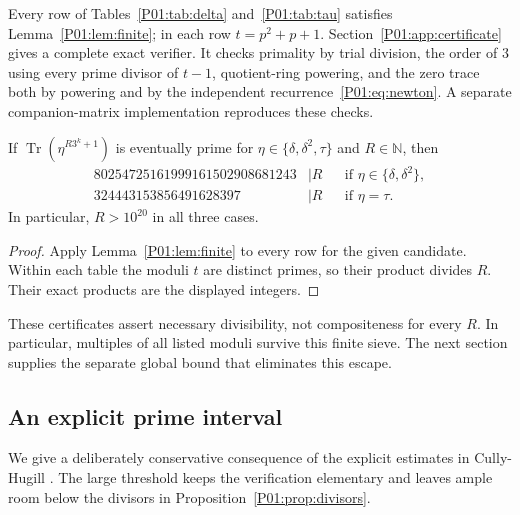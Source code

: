 \documentclass[11pt,a4paper]{article}
\theoremstyle{definition}\newtheorem{definition}[theorem]{Definition}
\theoremstyle{remark}\newtheorem{remark}[theorem]{Remark}
\newcommand{\N}{\mathbb N}\newcommand{\Z}{\mathbb Z}\newcommand{\Q}{\mathbb Q}
\DeclareMathOperator{\Tr}{Tr}\DeclareMathOperator{\tr}{tr}\DeclareMathOperator{\Nm}{N}
\begin{document}
Every row of Tables~\ref{P01:tab:delta} and~\ref{P01:tab:tau} satisfies
Lemma~\ref{P01:lem:finite}; in each row $t=p^2+p+1$.
Section~\ref{P01:app:certificate} gives a complete exact verifier.
It checks primality by trial division, the order of $3$ using every
prime divisor of $t-1$, quotient-ring powering, and the zero trace
both by powering and by the independent recurrence~\eqref{P01:eq:newton}.
A separate companion-matrix implementation reproduces these checks.

\begin{proposition}\label{P01:prop:divisors}
If $\Tr(\eta^{R3^k+1})$ is eventually prime for
$\eta\in\{\delta,\delta^2,\tau\}$ and $R\in\N$, then
\begin{align*}
 80254725161999161502908681243&\mid R
       &&\text{if }\eta\in\{\delta,\delta^2\},\\
 324443153856491628397&\mid R
       &&\text{if }\eta=\tau.
\end{align*}
In particular, $R>10^{20}$ in all three cases.
\end{proposition}
\begin{proof}
Apply Lemma~\ref{P01:lem:finite} to every row for the given candidate.
Within each table the moduli $t$ are distinct primes, so their product
divides $R$. Their exact products are the displayed integers.
\end{proof}

These certificates assert necessary divisibility, not compositeness for
every $R$. In particular, multiples of all listed moduli survive this
finite sieve. The next section supplies the separate global bound that
eliminates this escape.

\subsection{An explicit prime interval}\label{P01:sec:gap}

We give a deliberately conservative consequence of the explicit
estimates in Cully-Hugill \cite{CH}. The large threshold keeps the
verification elementary and leaves ample room below the divisors in
Proposition~\ref{P01:prop:divisors}.
\end{document}
